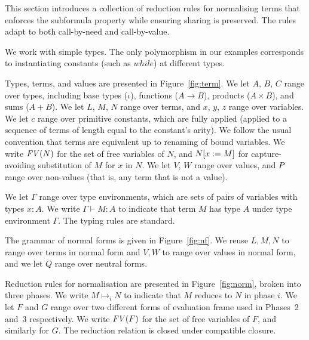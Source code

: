 

This section introduces a collection of reduction rules for
normalising terms that enforces the subformula property 
while ensuring sharing is preserved. The rules adapt to
both call-by-need and call-by-value.

We work with simple types. The only polymorphism in our examples
corresponds to instantiating constants (such as $\mathit{while}$) at
different types.

Types, terms, and values are presented in Figure~\ref{fig:term}. We
let $A$, $B$, $C$ range over types, including base types ($\iota$),
functions ($A \to B$), products ($A \times B$), and sums ($A + B$).
We let $L$, $M$, $N$ range over terms, and $x$, $y$, $z$ range over
variables.  We let $c$ range over primitive constants, which are fully
applied (applied to a sequence of terms of length equal to the
constant's arity).  We follow the usual convention that terms are
equivalent up to renaming of bound variables. We write $\mathit{FV}(N)$ for
the set of free variables of $N$, and $N[x:=M]$ for
capture-avoiding substitution of $M$ for $x$ in $N$.
%
%
We let $V$, $W$ range over values, and $P$ range over non-values
(that is, any term that is not a value).

We let $\Gamma$ range over type environments, which are sets of pairs
of variables with types $x:A$. We write $\Gamma \vdash M:A$ to
indicate that term $M$ has type $A$ under type environment
$\Gamma$. The typing rules are standard.

The grammar of normal forms is given in Figure~\ref{fig:nf}. We reuse
$L,M,N$ to range over terms in normal form and $V,W$ to range over
values in normal form, and we let $Q$ range over neutral forms.

Reduction rules for normalisation are presented in
Figure~\ref{fig:norm}, broken into three phases. We write $M
\mapsto_i N$ to indicate that $M$ reduces to $N$ in phase $i$. We let
$F$ and $G$ range over two different forms of evaluation frame used in
Phases~2 and~3 respectively. We write $\mathit{FV}(F)$ for the set of free
variables of $F$, and similarly for $G$.
The reduction relation is closed under compatible closure.

\figterm
\fignf
\fignorm

